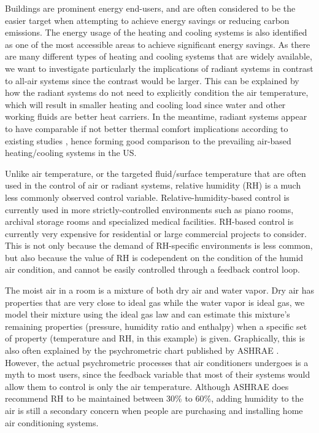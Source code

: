 Buildings are prominent energy end-users, and are often considered to be the easier target when attempting to achieve energy savings or reducing carbon emissions. The energy usage of the heating and cooling systems is also identified as one of the most accessible areas to achieve significant energy savings\cite{balaras_european_2007}. As there are many different types of heating and cooling systems that are widely available, we want to investigate particularly the implications of radiant systems in contrast to all-air systems since the contrast would be larger\cite{stetiu_energy_1999}. This can be explained by how the radiant systems do not need to explicitly condition the air temperature, which will result in smaller heating and cooling load since water and other working fluids are better heat carriers\cite{moe_thermally_2010}. In the meantime, radiant systems appear to have comparable \cite{karmann_thermal_2017} if not better thermal comfort implications according to existing studies \cite{fabrizio_numerical_2012}, hence forming good comparison to the prevailing air-based heating/cooling systems in the US.

Unlike air temperature, or the targeted fluid/surface temperature that are often used in the control of air or radiant systems, relative humidity (RH) is a much less commonly observed control variable\cite{rentel-gomez_decoupled_2001}. Relative-humidity-based control is currently used in more strictly-controlled environments such as piano rooms, archival storage rooms and specialized medical facilities\cite{staniforth_appropriate_1994,han_experimental_2011}. RH-based control is currently very expensive for residential or large commercial projects to consider\cite{henderson_energy_2014}. This is not only because the demand of RH-specific environments is less common, but also because the value of RH is codependent on the condition of the humid air condition, and cannot be easily controlled through a feedback control loop\cite{alahmer_effect_2011}. 

The moist air in a room is a mixture of both dry air and water vapor. Dry air has properties that are very close to ideal gas while the water vapor is ideal gas, we model their mixture using the ideal gas law and can estimate this mixture’s remaining properties (pressure, humidity ratio and enthalpy) when a specific set of property (temperature and RH, in this example) is given\cite{ansi/ashrae_standard_2017}. Graphically, this is also often explained by the psychrometric chart published by ASHRAE \cite{american_society_of_heating_refrigerating_and_air-conditioning_engineers_ashrae_1972}. However, the actual psychrometric processes that air conditioners undergoes is a myth to most users, since the feedback variable that most of their systems would allow them to control is only the air temperature\cite{pasgianos_nonlinear_2003}. Although ASHRAE does recommend RH to be maintained between 30\% to 60\%, adding humidity to the air is still a secondary concern when people are purchasing and installing home air conditioning systems\cite{american_society_of_heating_2007_2007}. 

